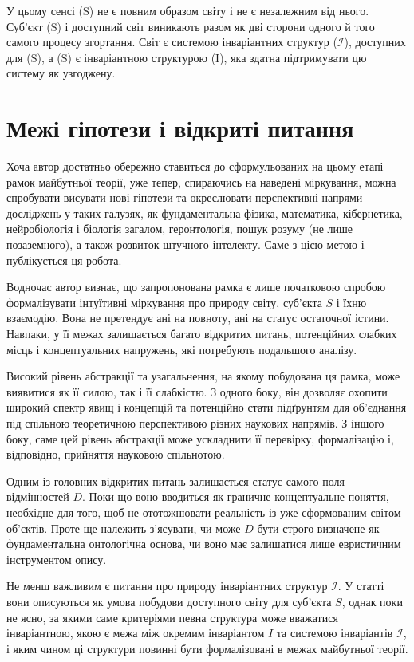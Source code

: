 \documentclass[aps,prd,onecolumn,nofootinbib,superscriptaddress]{revtex4-2} %
\begin{document}
    У цьому сенсі (S) не є повним образом світу і не є незалежним від нього. Суб’єкт (S) і доступний світ виникають разом як дві сторони одного й того самого процесу згортання. Світ є системою інваріантних структур ($\mathcal{I}$), доступних для (S), а (S) є інваріантною структурою (I), яка здатна підтримувати цю систему як узгоджену.


    \section{Межі гіпотези і відкриті питання}

    Хоча автор достатньо обережно ставиться до сформульованих на цьому етапі рамок майбутньої теорії, уже тепер, спираючись на наведені міркування, можна спробувати висувати нові гіпотези та окреслювати перспективні напрями досліджень у таких галузях, як фундаментальна фізика, математика, кібернетика, нейробіологія і біологія загалом, геронтологія, пошук розуму (не лише позаземного), а також розвиток штучного інтелекту. Саме з цією метою і публікується ця робота.

    Водночас автор визнає, що запропонована рамка є лише початковою спробою формалізувати інтуїтивні міркування про природу світу, суб’єкта \(S\) і їхню взаємодію. Вона не претендує ані на повноту, ані на статус остаточної істини. Навпаки, у її межах залишається багато відкритих питань, потенційних слабких місць і концептуальних напружень, які потребують подальшого аналізу.

    Високий рівень абстракції та узагальнення, на якому побудована ця рамка, може виявитися як її силою, так і її слабкістю. З одного боку, він дозволяє охопити широкий спектр явищ і концепцій та потенційно стати підґрунтям для об’єднання під спільною теоретичною перспективою різних наукових напрямів. З іншого боку, саме цей рівень абстракції може ускладнити її перевірку, формалізацію і, відповідно, прийняття науковою спільнотою.

    Одним із головних відкритих питань залишається статус самого поля відмінностей \(D\). Поки що воно вводиться як граничне концептуальне поняття, необхідне для того, щоб не ототожнювати реальність із уже сформованим світом об’єктів. Проте ще належить з’ясувати, чи може \(D\) бути строго визначене як фундаментальна онтологічна основа, чи воно має залишатися лише евристичним інструментом опису.

    Не менш важливим є питання про природу інваріантних структур \(\mathcal{I}\). У статті вони описуються як умова побудови доступного світу для суб’єкта \(S\), однак поки не ясно, за якими саме критеріями певна структура може вважатися інваріантною, якою є межа між окремим інваріантом \(I\) та системою інваріантів \(\mathcal{I}\), і яким чином ці структури повинні бути формалізовані в межах майбутньої теорії.
\end{document}
